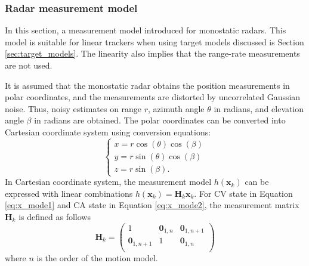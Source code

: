 \documentclass[english, 12pt, a4paper, elec, utf8, a-1b, online]{aaltothesis}
\renewcommand{\vec}[1]{\mathbf{#1}}
\newcommand{\x}{\vec{x}_k}
\newcommand{\omodel}{\vec{H}_k}
\begin{document}
\subsubsection{Radar measurement model}

In this section, a measurement model introduced for monostatic radars.
This model is suitable for linear trackers when using target models discussed is Section \ref{sec:target_models}.
The linearity also implies that the range-rate measurements are not used.

It is assumed that the monostatic radar obtains the position measurements in polar coordinates, and the measurements are distorted by uncorrelated Gaussian noise.
Thus, noisy estimates on range $r$, azimuth angle $\theta$ in radians, and elevation angle $\beta$ in radians are obtained.
The polar coordinates can be converted into Cartesian coordinate system using conversion equations:
\begin{equation}
\left\{
\begin{array}{l}
    x = r \cos(\theta) \cos(\beta) \\
    y = r \sin(\theta) \cos(\beta) \\
    z = r \sin(\beta).
\end{array}\right.
\end{equation}
In Cartesian coordinate system, the measurement model $h(\x)$ can be expressed with linear combinations $h(\x) = \omodel \x$.
For CV state in Equation \eqref{eq:x_mode1} and CA state in Equation \eqref{eq:x_mode2}, the measurement matrix $\omodel$ is defined as follows
\begin{equation}\label{eq:position_measurement_matrix}
    \omodel = 
       \begin{pmatrix}
            1 & \vec{0}_{1, n} & \vec{0}_{1, n+1}\\ 
            \vec{0}_{1, n+1} & 1 & \vec{0}_{1, n}\\ 
        \end{pmatrix}
\end{equation}
where $n$ is the order of the motion model.
\end{document}

